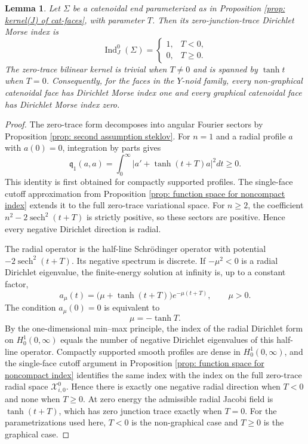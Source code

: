 \documentclass[11pt,twoside]{amsart}
\newtheorem{lem}[thm]{Lemma}
\numberwithin{equation}{section}
\begin{document}
\begin{lem}\label{lem: dirichlet index catenoidal faces}
Let $\Sigma$ be a catenoidal end parameterized as in Proposition \ref{prop: kernel(J) of cat-faces}, with parameter $T$. Then its zero-junction-trace Dirichlet Morse index is
\[
\operatorname{Ind}_{J}^{0}(\Sigma)=
\begin{cases}
1,&T<0,\\
0,&T\ge0.
\end{cases}
\]
The zero-trace bilinear kernel is trivial when $T\ne0$ and is spanned by $\tanh t$ when $T=0$. Consequently, for the faces in the $Y$-noid family, every non-graphical catenoidal face has Dirichlet Morse index one and every graphical catenoidal face has Dirichlet Morse index zero.
\end{lem}
\begin{proof}
The zero-trace form decomposes into angular Fourier sectors by Proposition \ref{prop: second assumption steklov}. For $n=1$ and a radial profile $a$ with $a(0)=0$, integration by parts gives
\[
\mathfrak q_{1}(a,a)=\int_0^\infty
\left|a'+\tanh(t+T)a\right|^2dt\ge0.
\]
This identity is first obtained for compactly supported profiles. The single-face cutoff approximation from Proposition \ref{prop: function space for noncompact index} extends it to the full zero-trace variational space.
For $n\ge2$, the coefficient $n^2-2\operatorname{sech}^2(t+T)$ is strictly positive, so these sectors are positive. Hence every negative Dirichlet direction is radial.

The radial operator is the half-line Schrödinger operator with potential $-2\operatorname{sech}^2(t+T)$. Its negative spectrum is discrete. If $-\mu^2<0$ is a radial Dirichlet eigenvalue, the finite-energy solution at infinity is, up to a constant factor,
\[
a_\mu(t)=\bigl(\mu+\tanh(t+T)\bigr)e^{-\mu(t+T)},
\qquad \mu>0.
\]
The condition $a_\mu(0)=0$ is equivalent to
\[
\mu=-\tanh T.
\]
By the one-dimensional min--max principle, the index of the radial Dirichlet form on $H_0^1(0,\infty)$ equals the number of negative Dirichlet eigenvalues of this half-line operator. Compactly supported smooth profiles are dense in $H_0^1(0,\infty)$, and the single-face cutoff argument in Proposition \ref{prop: function space for noncompact index} identifies the same index with the index on the full zero-trace radial space $\mathcal X_{i,0}^0$. Hence there is exactly one negative radial direction when $T<0$ and none when $T\ge0$. At zero energy the admissible radial Jacobi field is $\tanh(t+T)$, which has zero junction trace exactly when $T=0$. For the parametrizations used here, $T<0$ is the non-graphical case and $T\ge0$ is the graphical case.
\end{proof}
\end{document}
